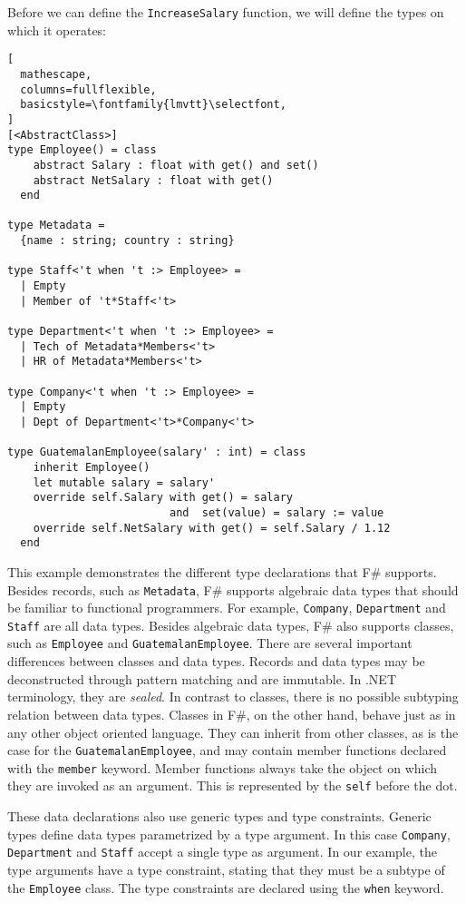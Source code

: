 \documentclass{sigplanconf}
\begin{document}
Before we can define the \verb+IncreaseSalary+ function, we will define the types on which it operates:
\begin{lstlisting}[
  mathescape,
  columns=fullflexible,
  basicstyle=\fontfamily{lmvtt}\selectfont,
]
[<AbstractClass>]
type Employee() = class
    abstract Salary : float with get() and set()
    abstract NetSalary : float with get()
  end

type Metadata = 
  {name : string; country : string}

type Staff<'t when 't :> Employee> =
  | Empty
  | Member of 't*Staff<'t>

type Department<'t when 't :> Employee> =
  | Tech of Metadata*Members<'t>
  | HR of Metadata*Members<'t>

type Company<'t when 't :> Employee> =
  | Empty
  | Dept of Department<'t>*Company<'t>

type GuatemalanEmployee(salary' : int) = class
    inherit Employee()
    let mutable salary = salary'
    override self.Salary with get() = salary
                         and  set(value) = salary := value
    override self.NetSalary with get() = self.Salary / 1.12
  end
\end{lstlisting}
This example demonstrates the different type declarations that F\# supports.
Besides records, such as \verb+Metadata+, F\# supports algebraic data types
that should be familiar to functional programmers. For example, \verb+Company+,
\verb+Department+ and \verb+Staff+ are all data types. Besides algebraic data types,
F\# also supports classes, such as \verb+Employee+ and
\verb+GuatemalanEmployee+. There are several important differences between classes
and data types. Records and data types may be deconstructed through pattern matching 
and are immutable. In .NET terminology, they are \emph{sealed}. In contrast to classes,
there is no possible subtyping relation between data types.
Classes in F\#, on the other hand, 
behave just as in any other object oriented language. They can inherit from
other classes, as is the case for the \verb+GuatemalanEmployee+, and may contain
member functions declared with the \verb+member+ keyword. Member
functions always take the object on which they are
invoked as an argument. This is represented by the \verb+self+ before the dot.

These data declarations also use generic types and type
constraints. Generic types define data types parametrized by a type
argument.  In this case \verb+Company+, \verb+Department+ and
\verb+Staff+ accept a single type as argument. In our example, the
type arguments have a type constraint, stating that they must be a
subtype of the \verb+Employee+ class. The type constraints are
declared using the \verb+when+ keyword.
\end{document}
